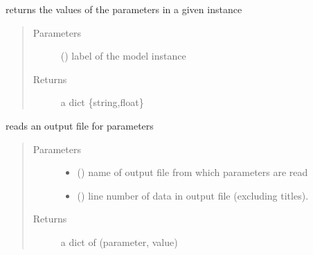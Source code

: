 \documentclass[letterpaper,10pt,english]{sphinxmanual}
\begin{document}

\begin{fulllineitems}
\label{\detokenize{functions:pyqcm.parameters}}
\sphinxAtStartPar
returns the values of the parameters in a given instance
\begin{quote}\begin{description}
\item[{Parameters}] \leavevmode
\sphinxAtStartPar
{} () \textendash{} label of the model instance

\item[{Returns}] \leavevmode
\sphinxAtStartPar
a dict \{string,float\}

\end{description}\end{quote}

\end{fulllineitems}


\begin{fulllineitems}
\label{\detokenize{functions:pyqcm.params_from_file}}
\sphinxAtStartPar
reads an output file for parameters
\begin{quote}\begin{description}
\item[{Parameters}] \leavevmode\begin{itemize}
\item {} 
\sphinxAtStartPar
{} () \textendash{} name of output file from which parameters are read

\item {} 
\sphinxAtStartPar
{} () \textendash{} line number of data in output file (excluding titles).

\end{itemize}

\item[{Returns}] \leavevmode
\sphinxAtStartPar
a dict of (parameter, value)

\end{description}\end{quote}

\end{fulllineitems}
\end{document}
